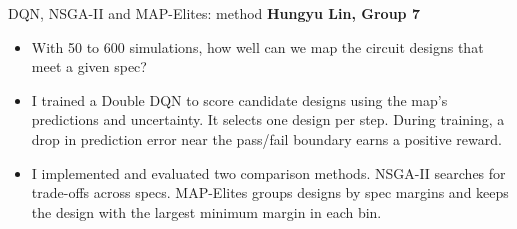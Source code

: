 

\begin{frame}{DQN, NSGA-II and MAP-Elites: method}
  \textbf{Hungyu Lin, Group 7}
  \begin{itemize}
    \item With 50 to 600 simulations, how well can we map the circuit designs that meet a given spec?
    \item I trained a Double DQN to score candidate designs using the map's predictions and uncertainty. It selects one design per step. During training, a drop in prediction error near the pass/fail boundary earns a positive reward.
    \item I implemented and evaluated two comparison methods. NSGA-II searches for trade-offs across specs. MAP-Elites groups designs by spec margins and keeps the design with the largest minimum margin in each bin.
  \end{itemize}
\end{frame}

